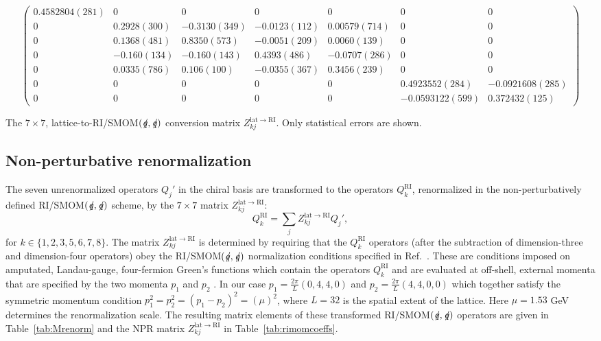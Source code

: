 \documentclass[aps,prl,
superscriptaddress,
showpacs,
preprintnumbers,
bibnotes,
amsmath,
amssymb,
twocolumn,
floatfix,
]{revtex4-1}
\def\slashed#1{\kern+0.10em /\kern-0.50em #1}
\begin{document}
\begin{table}
\begin{equation}
\left(
\begin{array}{ccccccc}
0.4582804(281) & 0 & 0 & 0 & 0 & 0 & 0 \\
0 & 0.2928(300) & -0.3130(349) & -0.0123(112) & 0.00579(714) & 0 & 0 \\
0 & 0.1368(481) & 0.8350(573) & -0.0051(209) & 0.0060(139) & 0 & 0 \\
0& -0.160(134) & -0.160(143) & 0.4393(486) & -0.0707(286) & 0 & 0 \\
0 & 0.0335(786) & 0.106(100) & -0.0355(367) & 0.3456(239) & 0 & 0 \\
0 & 0 & 0 & 0 & 0 & 0.4923552(284) & -0.0921608(285) \\
0 & 0 & 0 & 0 & 0 & -0.0593122(599)& 0.372432(125) 
\end{array}\right)
\nonumber
\end{equation}
\caption{The $7\times 7$, lattice-to-RI/SMOM$(\slashed q,\slashed q)$ conversion matrix $Z^{\mathrm{lat}\to\mathrm{RI}}_{kj}$.  Only statistical errors are shown. \label{tab:rimomcoeffs} }
\end{table}


\subsection{Non-perturbative renormalization}

The seven unrenormalized operators $Q_j'$ in the chiral basis are transformed to the operators $Q_k^{\mathrm{RI}}$, renormalized in the non-perturbatively defined RI/SMOM$(\slashed q,\slashed q)$ scheme, by the $7\times 7$ matrix $Z^{\mathrm{lat}\to\mathrm{RI}}_{kj}$:
\begin{equation}
Q_k^{\mathrm{RI}} = \sum_j Z^{\mathrm{lat}\to\mathrm{RI}}_{kj}Q_j', 
\end{equation}
for $k \in \{1, 2, 3, 5, 6, 7, 8\}$.  The matrix $Z^{\mathrm{lat}\to\mathrm{RI}}_{kj}$
is determined by requiring that the $Q_k^{\mathrm{RI}}$ operators (after the subtraction of dimension-three and dimension-four operators) obey the RI/SMOM$(\slashed q,\slashed q)$ normalization conditions specified in Ref.~\cite{Lehner:2011fz}.  These are conditions imposed on amputated, Landau-gauge, four-fermion Green's functions which contain the operators $Q_k^{\mathrm{RI}}$ and are evaluated at off-shell, external momenta that are specified by the two momenta $p_1$ and $p_2$ .  In our case $p_1 = \frac{2\pi}{L}(0,4,4,0)$ and $p_2 = \frac{2\pi}{L}(4,4,0,0)$ which together satisfy the symmetric momentum condition $p_1^2 = p_2^2 = (p_1-p_2)^2 = (\mu)^2$, where $L=32$ is the spatial extent of the lattice. Here $\mu= 1.53$ GeV determines the renormalization scale.  The resulting matrix elements of these transformed RI/SMOM$(\slashed q,\slashed q)$ operators are given in Table~\ref{tab:Mrenorm} and the NPR matrix  $Z^{\mathrm{lat}\to\mathrm{RI}}_{kj}$ in Table~\ref{tab:rimomcoeffs}.
\end{document}
